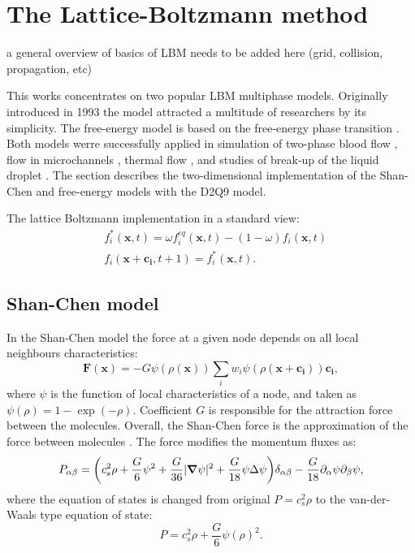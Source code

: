 \documentclass[mathpazo]{cicp}
\begin{document}
\section{The Lattice-Boltzmann method}

{\color{red} a general overview of basics of LBM needs to be added here (grid, collision, propagation, etc)}

\label{sec:lbm:binary:liquids}
This works concentrates on two popular LBM multiphase models. Originally introduced
in 1993 \cite{Shan-chen:extended} the model attracted a multitude of researchers
by its simplicity.  The free-energy model \cite{swift} is based on the free-energy
phase transition \cite{landau}. Both models werre successfully applied in simulation
of two-phase blood flow \cite{halliday-multicomponent}, flow in microchannels
\cite{pooley-contact}, thermal flow \cite{zhang-thermal}, and studies of break-up
of the liquid droplet \cite{nourgaliev-breakup}. The section describes the
two-dimensional implementation of the Shan-Chen and free-energy models with
the D2Q9 model.

The lattice Boltzmann implementation in a standard view:
\begin{equation}
\label{standard:implementation}
\begin{aligned}
&f_i^{*}(\bm{x},t)=\omega f_i^{eq}(\bm{x},t)-(1-\omega) f_i(\bm{x},t)\\
&f_i(\bm{x}+\bm{c_i},t+1)=f_i^{*}(\bm{x},t). 
\end{aligned}
\end{equation}

\subsection{Shan-Chen model}
In the Shan-Chen model \cite{Shan-chen:extended} the force at a given node depends
on all local neighbours characteristics:
\begin{equation}  \label{Shan-Chen:Shan-Chen:cont}
\bm{F}(\bm{x})=-G\psi(\rho(\bm{x}))\sum_{i}{w_i \psi(\rho(\bm{x}+\bm{c_i}))\bm{c_{i}}},
\end{equation}
where $\psi$ is the function of local characteristics of a node, and taken
as $\psi(\rho)=1-\exp(-\rho)$. Coefficient $G$ is responsible for the attraction
force between the molecules. Overall, the Shan-Chen force is the approximation of
the force between molecules \cite{kwok,kwok-contact-angle}. The force modifies
the momentum fluxes as:
\begin{equation*}
P_{\alpha\beta}=\biggl(c_s^2\rho+\frac{G}{6}\psi^2+\frac{G}{36}%
|\bm{\nabla}\psi|^2 +\frac{G}{18}\psi\Delta\psi\biggr)\delta_{\alpha\beta}-\frac{G}{%
18}\partial_{\alpha}\psi\partial_{\beta}\psi,
\end{equation*}
where the equation of states is changed from original $P=c_s^2 \rho$ \cite{Succi-book}
to the van-der-Waals type equation of state:
\begin{equation}
P=c_s^2 \rho +\frac{G}{6} \psi(\rho)^2.
\end{equation}
\end{document}
